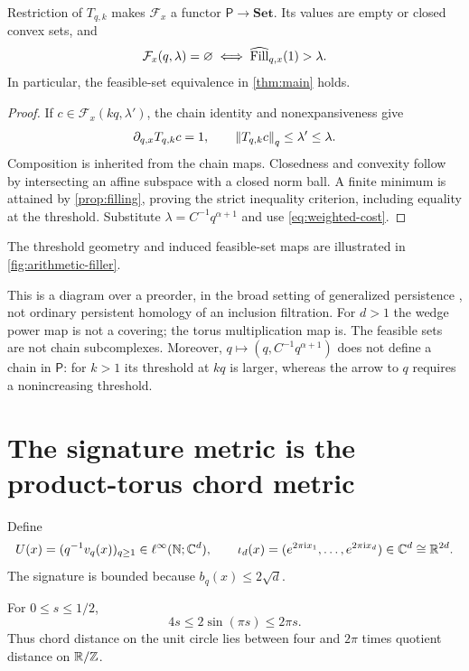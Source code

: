 \documentclass[11pt,a4paper]{article}
\begin{document}
\begin{proposition}\label{prop:feasible}
Restriction of $T_{q,k}$ makes $\mathcal F_x$ a functor
$\mathsf P\to\mathbf{Set}$.  Its values are empty or closed convex
sets, and
\[
 \mathcal F_x(q,\lambda)=\varnothing\iff\operatorname{\widehat{Fill}}_{q,x}(1)>\lambda.
\]
In particular, the feasible-set equivalence in \cref{thm:main} holds.
\end{proposition}

\begin{proof}
If $c\in\mathcal F_x(kq,\lambda')$, the chain identity and
nonexpansiveness give
\[
 \partial_{q,x}T_{q,k}c=1,\qquad
 \left\lVert T_{q,k}c\right\rVert_q\leq\lambda'\leq\lambda.
\]
Composition is inherited from the chain maps.  Closedness and convexity
follow by intersecting an affine subspace with a closed norm ball.  A
finite minimum is attained by \cref{prop:filling}, proving the strict
inequality criterion, including equality at the threshold.  Substitute
$\lambda=C^{-1}q^{\alpha+1}$ and use \cref{eq:weighted-cost}.
\end{proof}

The threshold geometry and induced feasible-set maps are illustrated in
\cref{fig:arithmetic-filler}.


This is a diagram over a preorder, in the broad setting of generalized
persistence \cite{bubenik-desilva-scott}, not ordinary persistent homology
of an inclusion filtration.  For $d>1$ the wedge power map is not a
covering; the torus multiplication map is.  The feasible sets are not
chain subcomplexes.  Moreover, $q\mapsto(q,C^{-1}q^{\alpha+1})$ does
not define a chain in $\mathsf P$: for $k>1$ its threshold at $kq$ is
larger, whereas the arrow to $q$ requires a nonincreasing threshold.

\section{The signature metric is the product-torus chord metric}
\label{sec:signature}

Define
\[
 U(x)=(q^{-1}v_q(x))_{q\geq1}\in\ell^\infty(\mathbb N;\mathbb C^d),
 \qquad
 \iota_d(x)=(e^{2\pi\mathrm i x_1},\ldots,e^{2\pi\mathrm i x_d})
                 \in\mathbb C^d\cong\mathbb R^{2d}.
\]
The signature is bounded because $b_q(x)\leq2\sqrt d$.

\begin{lemma}\label{lem:chord}
For $0\leq s\leq1/2$,
\[
 4s\leq2\sin(\pi s)\leq2\pi s.
\]
Thus chord distance on the unit circle lies between four and $2\pi$
times quotient distance on $\mathbb R/\mathbb Z$.
\end{lemma}
\end{document}
